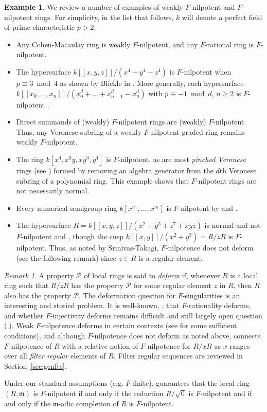 \documentclass{amsproc}
\theoremstyle{definition}
\newtheorem{example}[theorem]{Example}
\theoremstyle{remark}
\newtheorem{remark}[theorem]{Remark}
\numberwithin{equation}{section}
\newcommand{\fm}{\mathfrak{m}}
\begin{document}
\begin{example} We review a number of examples of weakly $F$-nilpotent and $F$-nilpotent rings. For simplicity, in the list that follows, $k$ will denote a perfect field of prime characteristic $p>2$.
\begin{itemize}
\item Any Cohen-Macaulay ring is weakly $F$-nilpotent, and any $F$-rational ring is $F$-nilpotent.
\item The hypersurface $k[[x,y,z]]/(x^4 + y^4 - z^4)$ is $F$-nilpotent when $p \equiv 3 \bmod 4$ as shown by Blickle in \cite[Ex. 5.28]{Bli04}. More generally, each hypersurface $k[[x_0,\ldots,x_n]]/(x_0^d + \ldots + x_{n-1}^d - x_n^d)$ with $p \equiv -1 \bmod d$, $n \geq 2$ is $F$-nilpotent \cite[Lem. 4.19]{MM24}. 
\item Direct summands of (weakly) $F$-nilpotent rings are (weakly) $F$-nilpotent. Thus, any Veronese subring of a weakly $F$-nilpotent graded ring remains weakly $F$-nilpotent. 
\item The ring $k[x^4,x^3y,xy^3,y^4]$ is $F$-nilpotent, as are most \textit{pinched Veronese} rings (see \cite[Thm. B]{MP23}) formed by removing an algebra generator from the $d$th Veronese subring of a polynomial ring. This example shows that $F$-nilpotent rings are not necessarily normal.
\item Every numerical semigroup ring $k[x^{n_1},\ldots,x^{n_t}]$ is $F$-nilpotent by \cite[Ex. 3.8]{MS25} and \cite[Cor. 4.4]{MS25}. 
\item The hypersurface $R=k[[x,y,z]]/(x^2+y^3+z^7+xyz)$ is normal and not $F$-nilpotent \cite[Rmk. 3.15]{DMP24} and \cite[Ex. 2.7]{ST17}, though the cusp $k[[x,y]]/(x^2+y^3)=R/zR$ is $F$-nilpotent. Thus, as noted by Srinivas-Takagi, $F$-nilpotence does not deform (see the following remark) since $z \in R$ is a regular element. 
\end{itemize}
\end{example}

\begin{remark}
A property $\mathcal{P}$ of local rings is said to \textit{deform} if, whenever $R$ is a local ring such that $R/zR$ has the property $\mathcal{P}$ for some regular element $z$ in $R$, then $R$ also has the property $\mathcal{P}$. The deformation question for $F$-singularities is an interesting and storied problem. It is well-known, \cite{HH94}, that $F$-rationality deforms, and whether $F$-injectivity deforms remains  difficult and still largely open question (\cite{HMS14},\cite{DSM22}). Weak $F$-nilpotence deforms in certain contexts (see \cite[Sec. 5]{CMM23} for some sufficient conditions), and although $F$-nilpotence does not deform as noted above, \cite[Thm. B]{PQ19} connects $F$-nilpotence of $R$ with a relative notion of $F$-nilpotence for $R/xR$ as $x$ ranges over all \textit{filter regular} elements of $R$. Filter regular sequences are reviewed in Section~\ref{sec:genfte}.
\end{remark} Under our standard assumptions (e.g. $F$-finite), \cite[Prop. 2.8]{PQ19} guarantees that the local ring $(R,\fm)$ is $F$-nilpotent if and only if the reduction $R/\sqrt{0}$ is $F$-nilpotent and if and only if the $\fm$-adic completion of $R$ is $F$-nilpotent. 
\end{document}
